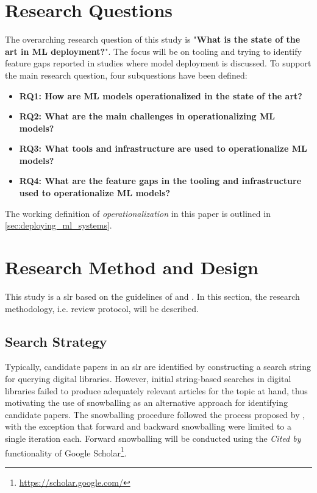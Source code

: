 \section{Research Questions}
\label{sec:research_questions}
The overarching research question of this study is "\textbf{What is the state of the art in ML deployment?}".
The focus will be on tooling and trying to identify feature gaps reported in studies where model deployment is discussed.
To support the main research question, four subquestions have been defined:
\begin{itemize}
    \item \textbf{RQ1: How are ML models operationalized in the state of the art?}
    \item \textbf{RQ2: What are the main challenges in operationalizing ML models?}
    \item \textbf{RQ3: What tools and infrastructure are used to operationalize ML models?}
    \item \textbf{RQ4: What are the feature gaps in the tooling and infrastructure used to operationalize ML models?}
\end{itemize}
The working definition of \emph{operationalization} in this paper is outlined in \cref{sec:deploying_ml_systems}.

\section{Research Method and Design}
\label{sec:research_method}
This study is a \acrfull{slr} based on the guidelines of \textcite{Kitchenham07guidelinesfor} and \textcite{Wohlin2014}.
In this section, the research methodology, i.e. review protocol, will be described.

\subsection{Search Strategy}
Typically, candidate papers in an \acrshort{slr} are identified by constructing a search string for querying digital libraries.
However, initial string-based searches in digital libraries failed to produce adequately relevant articles for the topic at hand, thus motivating the use of snowballing as an alternative approach for identifying candidate papers.
The snowballing procedure followed the process proposed by \textcite{Wohlin2014}, with the exception that forward and backward snowballing were limited to a single iteration each.
Forward snowballing will be conducted using the \emph{Cited by} functionality of Google Scholar\footnote{\url{https://scholar.google.com/}}.

